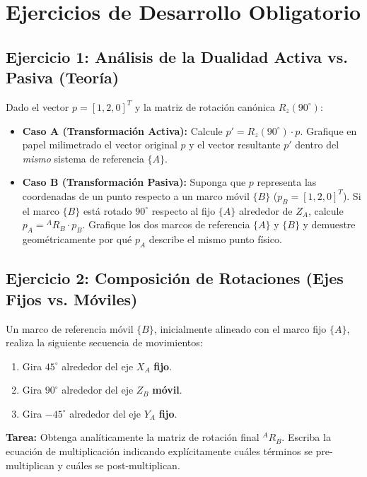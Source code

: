 \documentclass[11pt, a4paper]{article}
\begin{document}
\section{Ejercicios de Desarrollo Obligatorio}

\subsection*{Ejercicio 1: Análisis de la Dualidad Activa vs. Pasiva (Teoría)}
Dado el vector $p = [1, 2, 0]^T$ y la matriz de rotación canónica $R_z(90^\circ)$:
\begin{itemize}
    \item \textbf{Caso A (Transformación Activa):} Calcule $p' = R_z(90^\circ) \cdot p$. Grafique en papel milimetrado el vector original $p$ y el vector resultante $p'$ dentro del \textit{mismo} sistema de referencia $\{A\}$.
    \item \textbf{Caso B (Transformación Pasiva):} Suponga que $p$ representa las coordenadas de un punto respecto a un marco móvil $\{B\}$ ($p_B = [1, 2, 0]^T$). Si el marco $\{B\}$ está rotado $90^\circ$ respecto al fijo $\{A\}$ alrededor de $Z_A$, calcule $p_A = {}^{A}R_B \cdot p_B$. Grafique los dos marcos de referencia $\{A\}$ y $\{B\}$ y demuestre geométricamente por qué $p_A$ describe el mismo punto físico.
\end{itemize}

\subsection*{Ejercicio 2: Composición de Rotaciones (Ejes Fijos vs. Móviles)}
Un marco de referencia móvil $\{B\}$, inicialmente alineado con el marco fijo $\{A\}$, realiza la siguiente secuencia de movimientos:
\begin{enumerate}
    \item Gira $45^\circ$ alrededor del eje $X_A$ \textbf{fijo}.
    \item Gira $90^\circ$ alrededor del eje $Z_B$ \textbf{móvil}.
    \item Gira $-45^\circ$ alrededor del eje $Y_A$ \textbf{fijo}.
\end{enumerate}
\textbf{Tarea:} Obtenga analíticamente la matriz de rotación final $^{A}R_B$. Escriba la ecuación de multiplicación indicando explícitamente cuáles términos se pre-multiplican y cuáles se post-multiplican.
\end{document}
